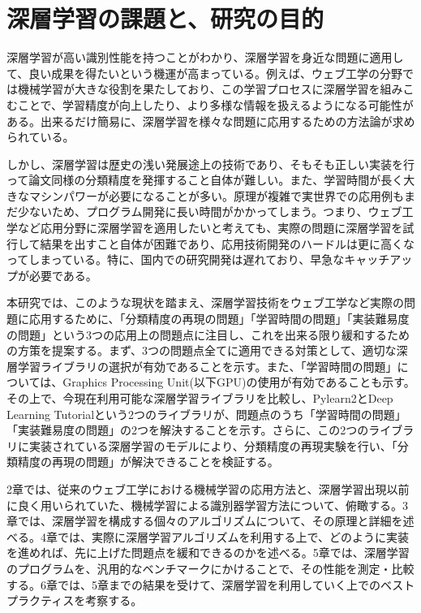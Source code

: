 \section{深層学習の課題と、研究の目的}
深層学習が高い識別性能を持つことがわかり、深層学習を身近な問題に適用して、良い成果を得たいという機運が高まっている。例えば、ウェブ工学の分野では機械学習が大きな役割を果たしており、この学習プロセスに深層学習を組みこむことで、学習精度が向上したり、より多様な情報を扱えるようになる可能性がある。出来るだけ簡易に、深層学習を様々な問題に応用するための方法論が求められている。\par
しかし、深層学習は歴史の浅い発展途上の技術であり、そもそも正しい実装を行って論文同様の分類精度を発揮すること自体が難しい。また、学習時間が長く大きなマシンパワーが必要になることが多い。原理が複雑で実世界での応用例もまだ少ないため、プログラム開発に長い時間がかかってしまう。つまり、ウェブ工学など応用分野に深層学習を適用したいと考えても、実際の問題に深層学習を試行して結果を出すこと自体が困難であり、応用技術開発のハードルは更に高くなってしまっている。特に、国内での研究開発は遅れており、早急なキャッチアップが必要である。\par
本研究では、このような現状を踏まえ、深層学習技術をウェブ工学など実際の問題に応用するために、「分類精度の再現の問題」「学習時間の問題」「実装難易度の問題」という3つの応用上の問題点に注目し、これを出来る限り緩和するための方策を提案する。まず、3つの問題点全てに適用できる対策として、適切な深層学習ライブラリの選択が有効であることを示す。また、「学習時間の問題」については、Graphics Processing Unit(以下GPU)の使用が有効であることも示す。その上で、今現在利用可能な深層学習ライブラリを比較し、Pylearn2とDeep Learning Tutorialという2つのライブラリが、問題点のうち「学習時間の問題」「実装難易度の問題」の2つを解決することを示す。さらに、この2つのライブラリに実装されている深層学習のモデルにより、分類精度の再現実験を行い、「分類精度の再現の問題」が解決できることを検証する。\par
2章では、従来のウェブ工学における機械学習の応用方法と、深層学習出現以前に良く用いられていた、機械学習による識別器学習方法について、俯瞰する。3章では、深層学習を構成する個々のアルゴリズムについて、その原理と詳細を述べる。4章では、実際に深層学習アルゴリズムを利用する上で、どのように実装を進めれば、先に上げた問題点を緩和できるのかを述べる。5章では、深層学習のプログラムを、汎用的なベンチマークにかけることで、その性能を測定・比較する。6章では、5章までの結果を受けて、深層学習を利用していく上でのベストプラクティスを考察する。
